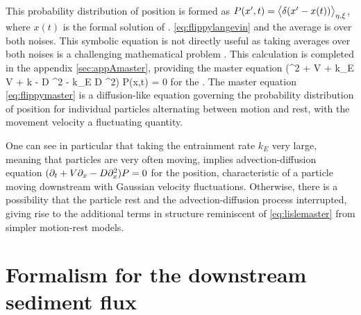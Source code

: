 This probability distribution of position is formed as $ P(x',t) = \big\langle \delta(x'-x(t))\big\rangle_{\eta,\xi} $, where $x(t)$ is the formal solution of \DIFdelbegin {}\DIFdelend \DIFaddbegin {}\DIFaddend . \ref{eq:flippylangevin} and the average is over both noises.
This symbolic equation is not directly useful as taking averages over both noises is a challenging mathematical problem \DIFdelbegin {}\DIFdelend \DIFaddbegin {}\DIFaddend . This calculation is completed in the appendix \DIFdelbegin {}\DIFdelend \DIFaddbegin {}\DIFaddend \ref{sec:appAmaster}, providing the master equation
\be (\pt^2 + V \px \pt + k_E V \px + k \pt - D \px^2 \pt - k_E D \px^2) P(x,t) = 0 \label{eq:flippymaster}\ee
for the \DIFdelbegin {}\DIFdelend \DIFaddbegin {}\DIFaddend .
The master equation \ref{eq:flippymaster} is a diffusion-like equation governing the probability distribution of position for individual particles alternating between motion and rest, with the movement velocity \DIFdelbegin {}\DIFdelend \DIFaddbegin {}\DIFaddend a fluctuating quantity.

One can see in particular that taking the entrainment rate $k_E$ very large, meaning that particles are very often moving, implies \DIFdelbegin {}\DIFdelend \DIFaddbegin {}\DIFaddend advection-diffusion equation $(\partial_t + V\partial_x -D \partial_x^2)P=0$ for the position, characteristic of a particle moving downstream with Gaussian velocity fluctuations\DIFdelbegin {}\DIFdelend . Otherwise, there is a possibility that the particle \DIFdelbegin {}\DIFdelend \DIFaddbegin {}\DIFaddend rest and the advection-diffusion process \DIFaddbegin {}\DIFaddend interrupted, giving rise to the additional terms in \DIFdelbegin {}\DIFdelend \DIFaddbegin {}\DIFaddend structure reminiscent of \DIFdelbegin {}\DIFdelend \DIFaddbegin {}\DIFaddend \ref{eq:lislemaster} from simpler motion-rest models.

\section{Formalism for the downstream sediment flux}
\label{sec:flippyflux}

